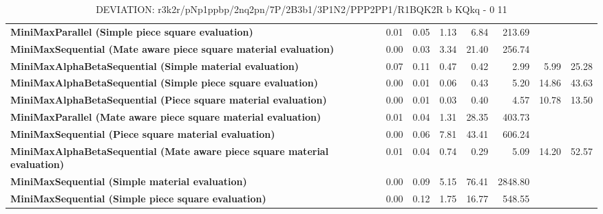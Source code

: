 \begin{table}[H]
{\begin{tabular}{|p{8cm}|*{7}{r|}}
\rowcolor[HTML]{FFFFFF}
\textbf{MiniMaxParallel (Simple piece square evaluation)}               & 0.01 & 0.05 & 1.13 & 6.84 & 213.69 &  &  \\

\rowcolor[HTML]{EFEFEF}
\textbf{MiniMaxSequential (Mate aware piece square material evaluation)}               & 0.00 & 0.03 & 3.34 & 21.40 & 256.74 &  &  \\

\rowcolor[HTML]{FFFFFF}
\textbf{MiniMaxAlphaBetaSequential (Simple material evaluation)}               & 0.07 & 0.11 & 0.47 & 0.42 & 2.99 & 5.99 & 25.28 \\

\rowcolor[HTML]{EFEFEF}
\textbf{MiniMaxAlphaBetaSequential (Simple piece square evaluation)}               & 0.00 & 0.01 & 0.06 & 0.43 & 5.20 & 14.86 & 43.63 \\

\rowcolor[HTML]{FFFFFF}
\textbf{MiniMaxAlphaBetaSequential (Piece square material evaluation)}               & 0.00 & 0.01 & 0.03 & 0.40 & 4.57 & 10.78 & 13.50 \\

\rowcolor[HTML]{EFEFEF}
\textbf{MiniMaxParallel (Mate aware piece square material evaluation)}               & 0.01 & 0.04 & 1.31 & 28.35 & 403.73 &  &  \\

\rowcolor[HTML]{FFFFFF}
\textbf{MiniMaxSequential (Piece square material evaluation)}               & 0.00 & 0.06 & 7.81 & 43.41 & 606.24 &  &  \\

\rowcolor[HTML]{EFEFEF}
\textbf{MiniMaxAlphaBetaSequential (Mate aware piece square material evaluation)}               & 0.01 & 0.04 & 0.74 & 0.29 & 5.09 & 14.20 & 52.57 \\

\rowcolor[HTML]{FFFFFF}
\textbf{MiniMaxSequential (Simple material evaluation)}               & 0.00 & 0.09 & 5.15 & 76.41 & 2848.80 &  &  \\

\rowcolor[HTML]{EFEFEF}
\textbf{MiniMaxSequential (Simple piece square evaluation)}               & 0.00 & 0.12 & 1.75 & 16.77 & 548.55 &  &  \\

            \hline
        \end{tabular}%
    }
    \caption{DEVIATION: r3k2r/pNp1ppbp/2nq2pn/7P/2B3b1/3P1N2/PPP2PP1/R1BQK2R b KQkq - 0 11}
    \label{tab:mid-game---fork---short-deviation}
\end{table}

